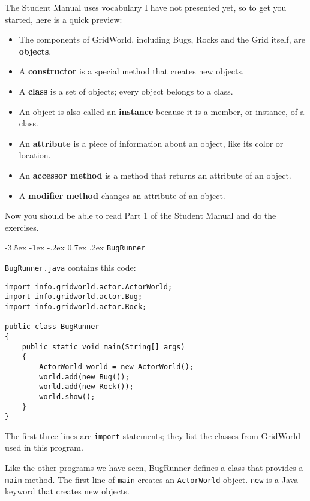 \documentclass{book}
\makeatletter
\renewcommand{\section}{\@startsection 
    {section} {1} {0mm}%
    {-3.5ex \@plus -1ex \@minus -.2ex}%
    {0.7ex \@plus.2ex}%
    {\normalfont\Large\bfseries}}
\makeatother
\begin{document}
The Student Manual uses vocabulary I have not presented yet, so to
get you started, here is a quick preview:

\begin{itemize}

\item The components of GridWorld, including Bugs, Rocks and the Grid
itself, are {\bf objects}.

\item A {\bf constructor} is a special method that creates new objects.

\item A {\bf class} is a set of objects; every object belongs to a
class.

\item An object is also called an {\bf instance} because it is a member,
or instance, of a class.

\item An {\bf attribute} is a piece of information about an object, like
its color or location.

\item An {\bf accessor method} is a method that returns an attribute of
an object.

\item A {\bf modifier method} changes an attribute of an object.

\end{itemize}

Now you should be able to read Part 1 of the Student Manual and do
the exercises.

\section{{\tt BugRunner}}

{\tt BugRunner.java} contains this code:

\begin{verbatim}
import info.gridworld.actor.ActorWorld;
import info.gridworld.actor.Bug;
import info.gridworld.actor.Rock;

public class BugRunner
{
    public static void main(String[] args)
    {
        ActorWorld world = new ActorWorld();
        world.add(new Bug());
        world.add(new Rock());
        world.show();
    }
}
\end{verbatim}

The first three lines are {\tt import} statements; they list
the classes from GridWorld used in this program.

Like the other programs we have seen, BugRunner defines a class
that provides a {\tt main} method.  The first line of {\tt main}
creates an {\tt ActorWorld} object.  {\tt new} is a Java keyword
that creates new objects.
\end{document}
